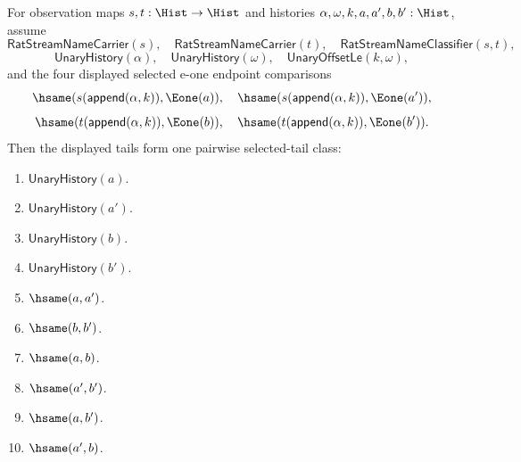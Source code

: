 \begin{theorem}
\label{thm:real-unary-streamname-finite-window-selected-e1-tail-pairwise-coherence}
For observation maps $s,t:\Hist\to\Hist$ and histories
$\alpha,\omega,k,a,a',b,b':\Hist$, assume
$$
\mathsf{RatStreamNameCarrier}(s),\quad
\mathsf{RatStreamNameCarrier}(t),\quad
\mathsf{RatStreamNameClassifier}(s,t),
$$
$$
\mathsf{UnaryHistory}(\alpha),\quad
\mathsf{UnaryHistory}(\omega),\quad
\mathsf{UnaryOffsetLe}(k,\omega),
$$
and the four displayed selected e-one endpoint comparisons
$$
\hsame(s(\mathsf{append}(\alpha,k)),\Eone(a)),\quad
\hsame(s(\mathsf{append}(\alpha,k)),\Eone(a')),
$$
$$
\hsame(t(\mathsf{append}(\alpha,k)),\Eone(b)),\quad
\hsame(t(\mathsf{append}(\alpha,k)),\Eone(b')).
$$
Then the displayed tails form one pairwise selected-tail class:
\begin{enumerate}
\item $\mathsf{UnaryHistory}(a)$.
\item $\mathsf{UnaryHistory}(a')$.
\item $\mathsf{UnaryHistory}(b)$.
\item $\mathsf{UnaryHistory}(b')$.
\item $\hsame(a,a')$.
\item $\hsame(b,b')$.
\item $\hsame(a,b)$.
\item $\hsame(a',b')$.
\item $\hsame(a,b')$.
\item $\hsame(a',b)$.
\end{enumerate}
\end{theorem}
